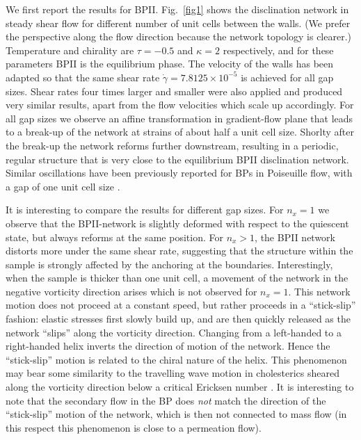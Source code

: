 \documentclass[12pt,twoside]{iopart}
\newcommand{\ex}[1]{\times10^{#1}}
\begin{document}
We first report the results for BPII.
Fig.~\ref{fig1} shows the disclination network in steady shear flow for different number of unit cells between the walls.
(We prefer the perspective along the flow direction because the network topology is clearer.)
Temperature and chirality are $\tau=-0.5$ and $\kappa=2$ respectively, and for these parameters BPII is the equilibrium phase.
The velocity of the walls has been adapted so that the same shear rate $\dot{\gamma}=7.8125\ex{-5}$ is achieved for all gap sizes.
Shear rates four times larger and smaller were also applied and produced very similar results, apart from the flow velocities which scale up accordingly.
For all gap sizes we observe an affine transformation in gradient-flow plane that leads to a break-up of the network at strains of about half a unit cell size.
Shorlty after the break-up the network reforms further downstream, resulting in a periodic, regular structure that is very close to the equilibrium
BPII disclination network. Similar oscillations have been previously reported for
BPs in Poiseuille flow, with a gap of one unit cell size \cite{Dupuis:2005}.

It is interesting to compare the results for different gap sizes.
For $n_x=1$ we observe that the BPII-network is slightly deformed with
respect to the quiescent state, but always reforms at the same position.
For $n_x > 1$, the BPII network distorts more under the same shear rate, 
suggesting that the structure within the sample is strongly affected by
the anchoring at the boundaries.
Interestingly, when the sample is thicker than one unit cell, a movement
of the network in the negative vorticity direction arises
which is not observed for $n_x=1$.
This network motion does not proceed at a constant speed, but rather
proceeds in a ``stick-slip'' fashion: elastic stresses first slowly build up,
and are then quickly released as the network ``slips'' along the vorticity
direction. Changing from a left-handed to a right-handed helix inverts the
direction of motion of the network.
Hence the ``stick-slip'' motion is related to the chiral nature of the helix.
This phenomenon may bear some similarity to the travelling wave motion in
cholesterics sheared along the vorticity direction 
below a critical Ericksen number \cite{Rey:1996a, Rey:1996b}.
It is interesting to note that the secondary flow in the BP
does {\em not} match the direction of the ``stick-slip'' motion of the network, which is then not connected to mass flow
(in this respect this phenomenon is close to a permeation flow).
\end{document}
